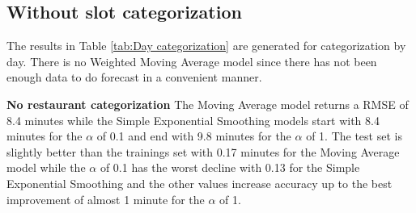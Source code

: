 \subsection{Without slot categorization}
The results in Table \ref{tab:Day categorization} are generated for categorization by day. There is no Weighted Moving Average model since there has not been enough data to do forecast in a convenient manner.
\begin{table}[h]
\centering
\caption{Day categorization without slots}
\label{tab:Day categorization}
\end{table}
\newline\newline\textbf{No restaurant categorization}\newline
The Moving Average model returns a RMSE of 8.4 minutes while the Simple Exponential Smoothing models start with 8.4 minutes for the $\alpha$ of 0.1 and end with 9.8 minutes for the $\alpha$ of 1. The test set is slightly better than the trainings set with 0.17 minutes for the Moving Average model while the $\alpha$ of 0.1 has the worst decline with 0.13 for the Simple Exponential Smoothing and the other values increase accuracy up to the best improvement of almost 1 minute for the $\alpha$ of 1.\newline

